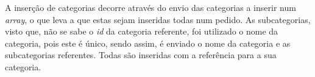 A inserção de categorias decorre através do envio das categorias a inserir num \textit{array}, o que leva a que estas sejam inseridas todas num pedido. As subcategorias, visto que, não se sabe o \textit{id} da categoria referente, foi utilizado o nome da categoria, pois este é único, sendo assim, é enviado o nome da categoria e as subcategorias referentes. Todas são inseridas com a referência para a sua categoria.
